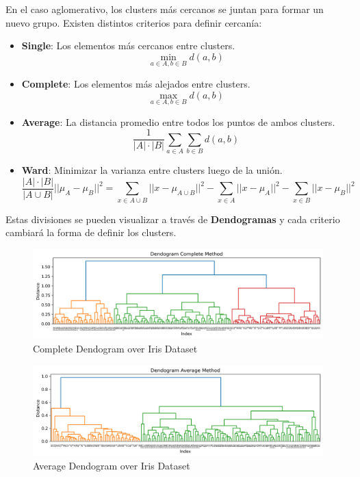 En el caso aglomerativo, los clusters más cercanos se juntan para formar un nuevo grupo. Existen distintos criterios para definir cercanía: 

\begin{itemize}
    \item \textbf{Single}: Los elementos más cercanos entre clusters. $$\min_{a \in A, b \in B} d(a,b)$$
    \item \textbf{Complete}: Los elementos más alejados entre clusters.  $$\max_{a \in A, b \in B} d(a,b)$$
    \item \textbf{Average}: La distancia promedio entre todos los puntos de ambos clusters. $$\frac{1}{|A| \cdot |B|}\sum_{a \in A} \sum_{b \in B} d(a,b)$$
    \item \textbf{Ward}: Minimizar la varianza entre clusters luego de la unión. 
    $$\frac{|A|\cdot|B|}{|A \cup B|}||\mu_A - \mu_B||^2 = \sum_{x \in A \cup B}||x - \mu_{A \cup B}||^2 - \sum_{x \in A}||x - \mu_{A}||^2 - \sum_{x \in B}||x - \mu_{B}||^2$$
\end{itemize}

Estas divisiones se pueden visualizar a través de \textbf{Dendogramas} y cada criterio cambiará la forma de definir los clusters.

\begin{figure}[H]
    \center
    \includegraphics[scale=0.5]{notebooks/ML/img/complete_dendogram_iris.png}
    \caption{Complete Dendogram over Iris Dataset}
\end{figure}

\begin{figure}[H]
    \center
    \includegraphics[scale=0.5]{notebooks/ML/img/average_dendogram_iris.png}
    \caption{Average Dendogram over Iris Dataset}
\end{figure}

